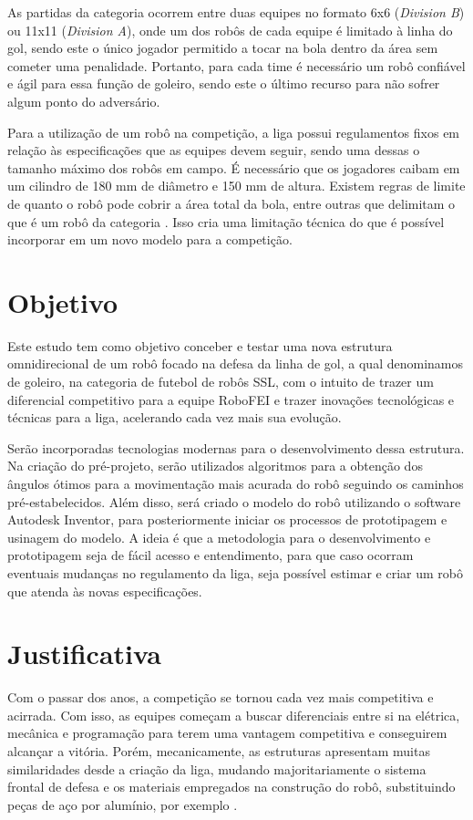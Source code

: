 \documentclass[deposito, acronym, symbols]{fei}
\begin{document}
As partidas da categoria ocorrem entre duas equipes no formato 6x6 (\textit{Division B}) ou 11x11 (\textit{Division A}), onde um dos robôs de cada equipe é limitado à linha do gol, sendo este o único jogador permitido a tocar na bola dentro da área sem cometer uma penalidade. Portanto, para cada time é necessário um robô confiável e ágil para essa função de goleiro, sendo este o último recurso para não sofrer algum ponto do adversário.

Para a utilização de um robô na competição, a liga possui regulamentos fixos em relação às especificações que as equipes devem seguir, sendo uma dessas o tamanho máximo dos robôs em campo. É necessário que os jogadores caibam em um cilindro de 180 mm de diâmetro e 150 mm de altura. Existem regras de limite de quanto o robô pode cobrir a área total da bola, entre outras que delimitam o que é um robô da categoria \cite{rules}. Isso cria uma limitação técnica do que é possível incorporar em um novo modelo para a competição. 

\section{Objetivo}

Este estudo tem como objetivo conceber e testar uma nova estrutura omnidirecional de um robô focado na defesa da linha de gol, a qual denominamos de goleiro, na categoria de futebol de robôs SSL, com o intuito de trazer um diferencial competitivo para a equipe RoboFEI e trazer inovações tecnológicas e técnicas para a liga, acelerando cada vez mais sua evolução. 

Serão incorporadas tecnologias modernas para o desenvolvimento dessa estrutura. Na criação do pré-projeto, serão utilizados algoritmos para a obtenção dos ângulos ótimos para a movimentação mais acurada do robô seguindo os caminhos pré-estabelecidos. Além disso, será criado o modelo do robô utilizando o software Autodesk Inventor, para posteriormente iniciar os processos de prototipagem e usinagem do modelo. A ideia é que a metodologia para o desenvolvimento e prototipagem seja de fácil acesso e entendimento, para que caso ocorram eventuais mudanças no regulamento da liga, seja possível estimar e criar um robô que atenda às novas especificações.

\section{Justificativa}

Com o passar dos anos, a competição se tornou cada vez mais competitiva e acirrada. Com isso, as equipes começam a buscar diferenciais entre si na elétrica, mecânica e programação para terem uma vantagem competitiva e conseguirem alcançar a vitória. Porém, mecanicamente, as estruturas apresentam muitas similaridades desde a criação da liga, mudando majoritariamente o sistema frontal de defesa e os materiais empregados na construção do robô, substituindo peças de aço por alumínio, por exemplo \cite{robofei2012}.
\end{document}
